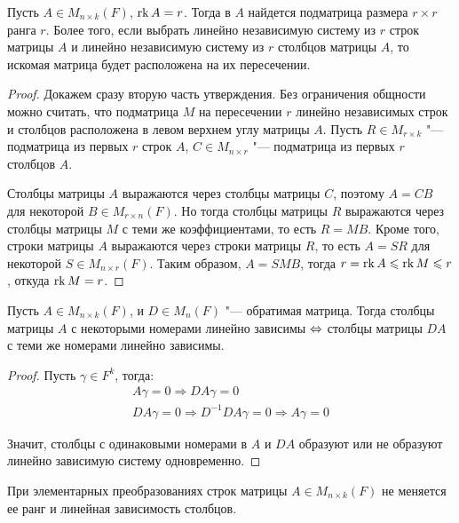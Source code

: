     \begin{theorem}
    	Пусть $A \in M_{n \times k}(F)$, $\operatorname{rk}{A} = r$. Тогда в $A$ найдется подматрица размера $r \times r$ ранга $r$. Более того, если выбрать линейно независимую систему из $r$ строк матрицы $A$ и линейно независимую систему из $r$ столбцов матрицы $A$, то искомая матрица будет расположена на их пересечении.
    \end{theorem}
    
    \begin{proof}
    	Докажем сразу вторую часть утверждения. Без ограничения общности можно считать, что подматрица $M$ на пересечении $r$ линейно независимых строк и столбцов расположена в левом верхнем углу матрицы $A$. Пусть $R \in M_{r \times k}$ "--- подматрица из первых $r$ строк $A$, $C \in M_{n \times r}$ "--- подматрица из первых $r$ столбцов $A$.
    	
    	Столбцы матрицы $A$ выражаются через столбцы матрицы $C$, поэтому $A = CB$ для некоторой $B \in M_{r \times n}(F)$. Но тогда столбцы матрицы $R$ выражаются через столбцы матрицы $M$ с теми же коэффициентами, то есть $R = MB$. Кроме того, строки матрицы $A$ выражаются через строки матрицы $R$, то есть $A = SR$ для некоторой $S \in M_{n \times r}(F)$. Таким образом, $A = SMB$, тогда $r = \operatorname{rk}{A} \leqslant \operatorname{rk}{M} \leqslant r$, откуда $\operatorname{rk}{M} = r$.
    \end{proof}
    
    \begin{proposition}
    	Пусть $A \in M_{n \times k}(F)$, и $D \in M_{n}(F)$ "--- обратимая матрица. Тогда столбцы матрицы $A$ с некоторыми номерами линейно зависимы $\Leftrightarrow$ столбцы матрицы $DA$ с теми же номерами линейно зависимы.
    \end{proposition}
    
    \begin{proof}
    	Пусть $\gamma \in F^k$, тогда:
    	\begin{gather*}
    		A\gamma = 0 \Rightarrow DA\gamma = 0\\
    		DA\gamma = 0 \Rightarrow D^{-1}DA\gamma = 0 \Rightarrow A\gamma = 0
    	\end{gather*}
    	
    	Значит, столбцы с одинаковыми номерами в $A$ и $DA$ образуют или не образуют линейно зависимую систему одновременно.
    \end{proof}
    
    \begin{corollary}
    	При элементарных преобразованиях строк матрицы $A \in M_{n \times k}(F)$ не меняется ее ранг и линейная зависимость столбцов.
    \end{corollary}
    
